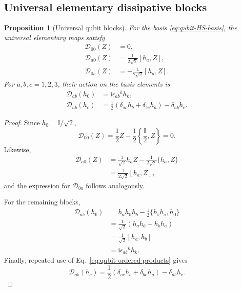 \documentclass[notitlepage,aip,reprint,onecolumn]{revtex4-1}
\newtheorem{proposition}[theorem]{Proposition}
\theoremstyle{definition}
\begin{document}
\subsection{Universal elementary dissipative blocks}

\begin{proposition}[Universal qubit blocks]
For the basis \eqref{eq:qubit-HS-basis}, the universal elementary maps satisfy
\begin{subequations}\label{eq:qubit-universal-D-blocks}
\begin{align}
    \mathcal D_{00}(Z)
    &=
    0,
    \\
    \mathcal D_{a0}(Z)
    &=
    \frac1{2\sqrt2}
    [h_a,Z],
    \\
    \mathcal D_{0a}(Z)
    &=
    -\frac1{2\sqrt2}
    [h_a,Z].
\end{align}
\end{subequations}
For \(a,b,c=1,2,3\), their action on the basis elements is
\begin{subequations}\label{eq:qubit-Dab-action}
\begin{align}
    \mathcal D_{ab}(h_0)
    &=
    \mathrm{i}\epsilon_{ab}{}^k h_k,
    \label{eq:qubit-Dab-h0}
    \\
    \mathcal D_{ab}(h_c)
    &=
    \frac12
    \left(
    \delta_{ac}h_b
    +
    \delta_{bc}h_a
    \right)
    -
    \delta_{ab}h_c.
    \label{eq:qubit-Dab-hc}
\end{align}
\end{subequations}
\end{proposition}

\begin{proof}
Since \(h_0=\mathbb I/\sqrt2\),
\[
\mathcal D_{00}(Z)
=
\frac12Z
-
\frac12
\left\{
\frac{\mathbb I}{2},Z
\right\}
=
0.
\]
Likewise,
\begin{align*}
\mathcal D_{a0}(Z)
&=
\frac1{\sqrt2}h_aZ
-
\frac1{2\sqrt2}
\{h_a,Z\}
\\
&=
\frac1{2\sqrt2}
[h_a,Z],
\end{align*}
and the expression for \(\mathcal D_{0a}\) follows analogously.

For the remaining blocks,
\begin{align*}
\mathcal D_{ab}(h_0)
&=
h_ah_0h_b
-
\frac12\{h_bh_a,h_0\}
\\
&=
\frac1{\sqrt2}
(h_ah_b-h_bh_a)
\\
&=
\frac1{\sqrt2}[h_a,h_b]
\\
&=
\mathrm{i}\epsilon_{ab}{}^k h_k.
\end{align*}
Finally, repeated use of
Eq.~\eqref{eq:qubit-ordered-products} gives
\[
\mathcal D_{ab}(h_c)
=
\frac12
\left(
\delta_{ac}h_b
+
\delta_{bc}h_a
\right)
-
\delta_{ab}h_c.
\]
\end{proof}
\end{document}
